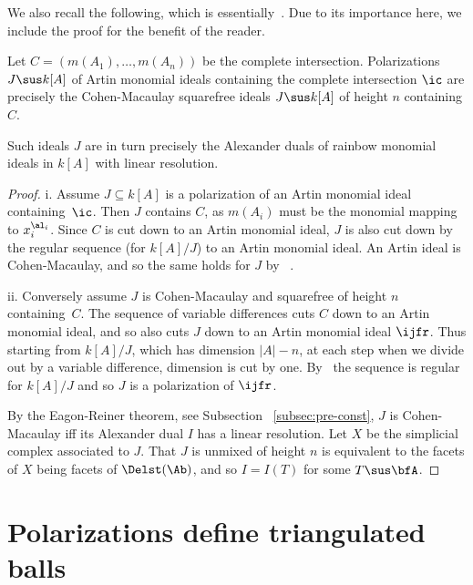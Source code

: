  We also recall the following, which is essentially~\cite[Prop.3.6]{AFL}.
  Due to its importance here,
  we include the proof for the benefit of the reader.
  
\begin{prop} \label{pro:pol-cm}
  Let $C = (m(A_1), \ldots, m(A_n))$ be the complete intersection.
  Polarizations $J \sus k[A]$ of Artin monomial ideals containing the complete
  intersection $\ic$
  are precisely the Cohen-Macaulay
  squarefree ideals $J \sus k[A]$ of height $n$  containing  $C$.

  Such ideals $J$ are in turn precisely 
    the Alexander duals of rainbow monomial ideals in $k[A]$ with
    linear resolution.
    \end{prop}

    \begin{proof} 
      i. Assume $J \subseteq k[A]$ is a polarization of an Artin
      monomial ideal containing~$\ic$. Then $J$ contains $C$, as
      $m(A_i)$ must be the monomial mapping to $x_i^{\al_i}$.
      Since $C$ is cut down to an Artin monomial ideal, $J$ is also cut
      down by the regular sequence (for $k[A]/J$) to an Artin monomial ideal.
      An Artin ideal is Cohen-Macaulay, and so the same holds for $J$ by
     ~\cite[Thm.~2.1.3.a]{BH93}.

      ii. Conversely assume $J$ is Cohen-Macaulay and squarefree of height $n$
      containing~$C$. The sequence
      of variable differences cuts $C$ down to an Artin monomial ideal,
      and so also cuts $J$ down to an Artin monomial ideal $\ijfr$. Thus
      starting from $k[A]/J$, which has dimension $|A|-n$, 
      at each step when we divide out by a variable difference,
      dimension is cut by one. By~\cite[Thm.~2.1.2.c]{BH93}
      the sequence is regular for $k[A]/J$ 
      and so $J$ is a polarization of $\ijfr$. 
      
      By the Eagon-Reiner theorem, see Subsection
     ~\ref{subsec:pre-const},
      $J$ is Cohen-Macaulay iff its Alexander dual $I$ has a linear resolution.
      Let $X$ be the simplicial complex associated to $J$. That $J$ is
      unmixed of height $n$ is equivalent to  the facets of $X$ being
      facets of $\Delst(\Ab)$, and so $I = I(T)$ for some $T \sus \bfA$.
    \end{proof}

\setcounter{section}{3}\setcounter{subsection}{0}
\section{Polarizations define triangulated balls}
\label{sec:polball}

